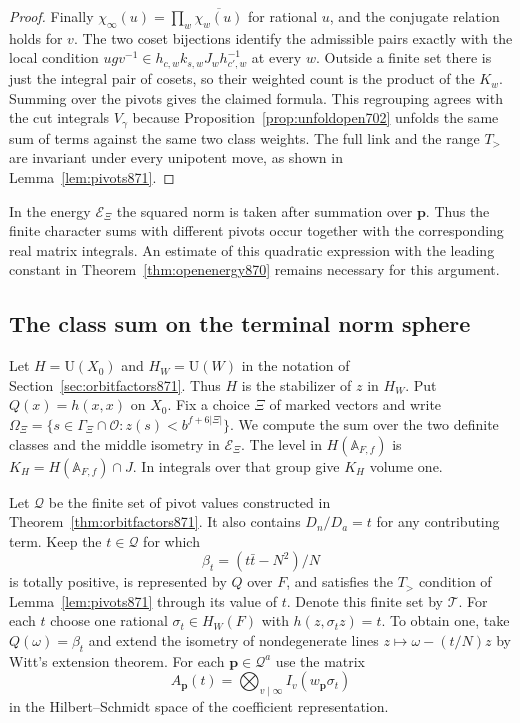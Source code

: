 \documentclass[a4paper,11pt]{article}
\theoremstyle{definition}
\theoremstyle{remark}
\numberwithin{equation}{section}
\begin{document}
\begin{proof}
Finally \(\chi_\infty(u)=\prod_w\overline{\chi_w(u)}\) for
rational \(u\), and the conjugate relation holds for \(v\).
The two coset bijections identify the admissible pairs exactly
with the local condition \(u g v^{-1}\in
h_{c,w}k_{s,w}J_w h_{c',w}^{-1}\) at every \(w\).
Outside a finite set there is just the integral pair of cosets,
so their weighted count is the product of the \(K_w\).
Summing over the pivots gives the claimed formula. This
regrouping agrees with the cut integrals \(V_\gamma\) because
Proposition~\ref{prop:unfoldopen702} unfolds the same sum of
terms against the same two class weights. The full link and
the range \(T_>\) are invariant under every unipotent move,
as shown in Lemma~\ref{lem:pivots871}.
\end{proof}

In the energy \(\mathcal E_\Xi\) the squared norm is taken
after summation over \(\mathbf p\). Thus the finite character
sums with different pivots occur together with the corresponding
real matrix integrals. An estimate of this quadratic expression
with the leading constant in Theorem~\ref{thm:openenergy870}
remains necessary for this argument.
\clearpage

\subsection{The class sum on the terminal norm sphere}
\label{sec:spheremean872}

Let \(H=\mathrm U(X_0)\) and \(H_W=\mathrm U(W)\) in the
notation of Section~\ref{sec:orbitfactors871}. Thus \(H\) is the
stabilizer of \(z\) in \(H_W\). Put \(Q(x)=h(x,x)\) on \(X_0\).
Fix a choice \(\Xi\) of marked vectors and write
\(\Omega_\Xi=\{s\in\Gamma_\Xi\cap\mathcal O:z(s)<b^{f+6|\Xi|}\}\).
We compute the sum over the two definite classes and the middle
isometry in \(\mathcal E_\Xi\).
The level in \(H(\mathbb A_{F,f})\) is \(K_H=H(\mathbb A_{F,f})\cap J\).
In integrals over that group give \(K_H\) volume one.

Let \(\mathcal Q\) be the finite set of pivot values constructed in
Theorem~\ref{thm:orbitfactors871}. It also contains \(D_n/D_a=t\)
for any contributing term. Keep the \(t\in\mathcal Q\) for which
\[
       \beta_t=(t\bar t-N^2)/N
\]
is totally positive, is represented by \(Q\) over \(F\), and
satisfies the \(T_>\) condition of Lemma~\ref{lem:pivots871}
through its value of \(t\). Denote this finite set by \(\mathcal T\).
For each \(t\) choose one rational \(\sigma_t\in H_W(F)\) with
\(h(z,\sigma_t z)=t\). To obtain one, take
\(Q(\omega)=\beta_t\) and extend the isometry of nondegenerate
lines \(z\longmapsto\omega-(t/N)z\) by Witt's extension theorem.
For each \(\mathbf p\in\mathcal Q^a\) use the matrix
\[
        A_{\mathbf p}(t)=
              \bigotimes_{v\mid\infty}I_v(w_{\mathbf p}\sigma_t)
\]
in the Hilbert--Schmidt space of the coefficient representation.
\end{document}
